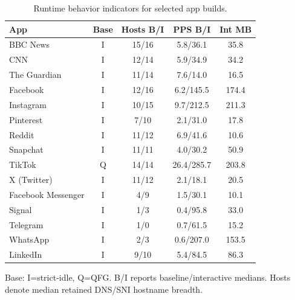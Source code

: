 \begin{table}[!t]
\centering
\caption{Runtime behavior indicators for selected app builds.}
\label{tab:runtime-behavior-summary}
\scriptsize
\begin{tabular}{lcccc}
\toprule
App & Base & Hosts B/I & PPS B/I & Int MB \\
\midrule
BBC News & I & 15/16 & 5.8/36.1 & 35.8 \\
CNN & I & 12/14 & 5.9/34.9 & 34.2 \\
The Guardian & I & 11/14 & 7.6/14.0 & 16.5 \\
Facebook & I & 12/16 & 6.2/145.5 & 174.4 \\
Instagram & I & 10/15 & 9.7/212.5 & 211.3 \\
Pinterest & I & 7/10 & 2.1/31.0 & 17.8 \\
Reddit & I & 11/12 & 6.9/41.6 & 10.6 \\
Snapchat & I & 11/11 & 4.0/30.2 & 50.9 \\
TikTok & Q & 14/14 & 26.4/285.7 & 203.8 \\
X (Twitter) & I & 11/12 & 2.1/18.1 & 20.5 \\
Facebook Messenger & I & 4/9 & 1.5/30.1 & 10.1 \\
Signal & I & 1/3 & 0.4/95.8 & 33.0 \\
Telegram & I & 1/0 & 0.7/61.5 & 15.2 \\
WhatsApp & I & 2/3 & 0.6/207.0 & 153.5 \\
LinkedIn & I & 9/10 & 5.4/84.5 & 86.3 \\
\bottomrule
\end{tabular}
\vspace{1pt}
\begin{flushleft}\scriptsize Base: I=strict-idle, Q=QFG. B/I reports baseline/interactive medians. Hosts denote median retained DNS/SNI hostname breadth.\end{flushleft}
\end{table}
